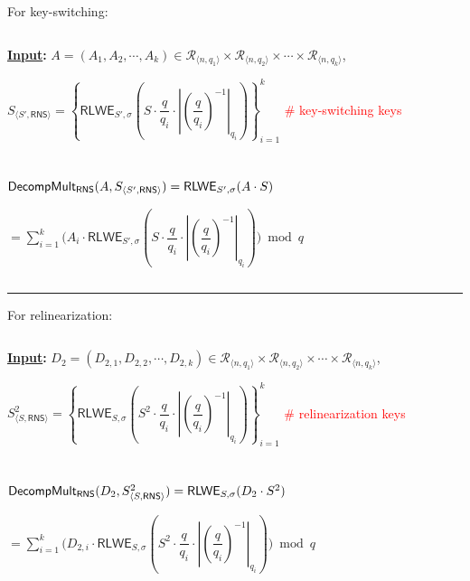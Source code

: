 \begin{tcolorbox}[title={\textbf{\tboxlabel{\ref*{subsec:rns-decompmult}} \textsf{DecompMult\textsubscript{RNS}}}}]

For key-switching:

$ $

\textbf{\underline{Input}:} $A = (A_1, A_2, \cdots, A_k) \in \mathcal{R}_{\langle n, q_1 \rangle} \times \mathcal{R}_{\langle n, q_2 \rangle} \times \cdots \times \mathcal{R}_{\langle n, q_k \rangle}$, 

\phantom{Input: } $S_{\langle S', \textsf{RNS}\rangle} = \left\{ \textsf{RLWE}_{S', \sigma}\left(S\cdot \dfrac{q}{q_i}\cdot\left|\left(\dfrac{q}{q_i}\right)^{-1}\right|_{q_i}\right) \right\}_{i=1}^{k}$ \textcolor{red}{ \# key-switching keys}

$ $

$ $

$\textsf{DecompMult\textsubscript{RNS}}(A, S_{\langle S', \textsf{RNS}\rangle}) = \textsf{RLWE}_{S', \sigma}(A \cdot S) $

$= \sum\limits_{i=1}^{k}\Bigg(A_{i}\cdot \textsf{RLWE}_{S', \sigma}\left(S \cdot\dfrac{q}{q_i} \cdot \left| \left(\dfrac{q}{q_i}\right)^{-1}\right|_{q_i}\right)\Bigg) \bmod q$


$ $

\par\noindent\rule{\textwidth}{0.4pt}



For relinearization:

$ $

\textbf{\underline{Input}:} $D_2 = (D_{2,1}, D_{2,2}, \cdots, D_{2,k}) \in \mathcal{R}_{\langle n, q_1 \rangle} \times \mathcal{R}_{\langle n, q_2 \rangle} \times \cdots \times \mathcal{R}_{\langle n, q_k \rangle}$,

\phantom{Input: } $S_{\langle S, \textsf{RNS}\rangle}^2 = \left\{ \textsf{RLWE}_{S, \sigma}\left(S^2\cdot \dfrac{q}{q_i}\cdot\left|\left(\dfrac{q}{q_i}\right)^{-1}\right|_{q_i}\right) \right\}_{i=1}^{k}$ \textcolor{red}{ \# relinearization keys}

$ $

$ $

$\textsf{DecompMult\textsubscript{RNS}}(D_2, S^2_{\langle S, \textsf{RNS}\rangle}) = \textsf{RLWE}_{S, \sigma}(D_2 \cdot S^2) $

$= \sum\limits_{i=1}^{k}\Bigg(D_{2,i}\cdot \textsf{RLWE}_{S, \sigma}\left(S^2 \cdot\dfrac{q}{q_i} \cdot \left| \left(\dfrac{q}{q_i}\right)^{-1}\right|_{q_i}\right)\Bigg) \bmod q$

\end{tcolorbox}




